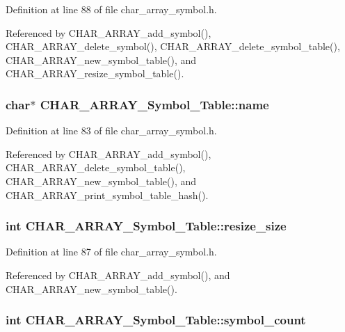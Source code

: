 Definition at line 88 of file char\_\-array\_\-symbol.h.

Referenced by CHAR\_\-ARRAY\_\-add\_\-symbol(), CHAR\_\-ARRAY\_\-delete\_\-symbol(), CHAR\_\-ARRAY\_\-delete\_\-symbol\_\-table(), CHAR\_\-ARRAY\_\-new\_\-symbol\_\-table(), and CHAR\_\-ARRAY\_\-resize\_\-symbol\_\-table().
\subsubsection{\setlength{\rightskip}{0pt plus 5cm}char$\ast$ \bf{CHAR\_\-ARRAY\_\-Symbol\_\-Table::name}}\label{structCHAR__ARRAY__Symbol__Table_b9ece518e464783cf98abf83e735264a}




Definition at line 83 of file char\_\-array\_\-symbol.h.

Referenced by CHAR\_\-ARRAY\_\-add\_\-symbol(), CHAR\_\-ARRAY\_\-delete\_\-symbol\_\-table(), CHAR\_\-ARRAY\_\-new\_\-symbol\_\-table(), and CHAR\_\-ARRAY\_\-print\_\-symbol\_\-table\_\-hash().
\subsubsection{\setlength{\rightskip}{0pt plus 5cm}int \bf{CHAR\_\-ARRAY\_\-Symbol\_\-Table::resize\_\-size}}\label{structCHAR__ARRAY__Symbol__Table_cae4707e85ab9446ff495d22700acbd5}




Definition at line 87 of file char\_\-array\_\-symbol.h.

Referenced by CHAR\_\-ARRAY\_\-add\_\-symbol(), and CHAR\_\-ARRAY\_\-new\_\-symbol\_\-table().
\subsubsection{\setlength{\rightskip}{0pt plus 5cm}int \bf{CHAR\_\-ARRAY\_\-Symbol\_\-Table::symbol\_\-count}}\label{structCHAR__ARRAY__Symbol__Table_43942dcac78c49b994a8022e18fed7b1}




